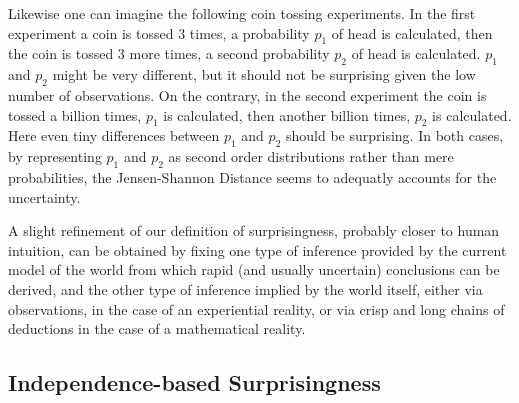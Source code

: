 \documentclass[runningheads]{llncs}
\begin{document}
Likewise one can imagine the following coin tossing experiments. In
the first experiment a coin is tossed 3 times, a probability $p_1$ of
head is calculated, then the coin is tossed 3 more times, a second
probability $p_2$ of head is calculated. $p_1$ and $p_2$ might be very
different, but it should not be surprising given the low number of
observations. On the contrary, in the second experiment the coin is
tossed a billion times, $p_1$ is calculated, then another billion
times, $p_2$ is calculated. Here even tiny differences between $p_1$
and $p_2$ should be surprising. In both cases, by representing $p_1$
and $p_2$ as second order distributions rather than mere
probabilities, the Jensen-Shannon Distance seems to adequatly accounts
for the uncertainty.

A slight refinement of our definition of surprisingness, probably
closer to human intuition, can be obtained by fixing one type of
inference provided by the current model of the world from which rapid
(and usually uncertain) conclusions can be derived, and the other type
of inference implied by the world itself, either via observations, in
the case of an experiential reality, or via crisp and long chains of
deductions in the case of a mathematical reality.

\subsection{Independence-based Surprisingness}
\label{IS}
\end{document}
